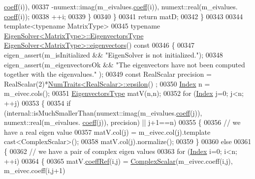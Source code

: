 \begin{DoxyCode}
      \hyperlink{class_eigen_1_1_plain_object_base_afbfc12954f16d21aedb7bd839f64a278}{coeff}(i)),
00337                                        -numext::imag(m\_eivalues.\hyperlink{class_eigen_1_1_plain_object_base_afbfc12954f16d21aedb7bd839f64a278}{coeff}(i)), numext::real(m\_eivalues.
      \hyperlink{class_eigen_1_1_plain_object_base_afbfc12954f16d21aedb7bd839f64a278}{coeff}(i));
00338       ++i;
00339     \}
00340   \}
00341   \textcolor{keywordflow}{return} matD;
00342 \}
00343 
00344 \textcolor{keyword}{template}<\textcolor{keyword}{typename} MatrixType>
00345 \textcolor{keyword}{typename} \hyperlink{group___core___module}{EigenSolver<MatrixType>::EigenvectorsType} 
      \hyperlink{group___eigenvalues___module_a66288022802172e3ee059283b26201d7}{EigenSolver<MatrixType>::eigenvectors}()\textcolor{keyword}{ const}
00346 \textcolor{keyword}{}\{
00347   eigen\_assert(m\_isInitialized && \textcolor{stringliteral}{"EigenSolver is not initialized."});
00348   eigen\_assert(m\_eigenvectorsOk && \textcolor{stringliteral}{"The eigenvectors have not been computed together with the eigenvalues."}
      );
00349   \textcolor{keyword}{const} RealScalar precision = RealScalar(2)*\hyperlink{group___core___module_struct_eigen_1_1_num_traits}{NumTraits<RealScalar>::epsilon}()
      ;
00350   \hyperlink{group___eigenvalues___module_a5bff6a6bc0efac67d52c60c2c3deb9ee}{Index} n = m\_eivec.cols();
00351   \hyperlink{group___core___module}{EigenvectorsType} matV(n,n);
00352   \textcolor{keywordflow}{for} (\hyperlink{group___eigenvalues___module_a5bff6a6bc0efac67d52c60c2c3deb9ee}{Index} j=0; j<n; ++j)
00353   \{
00354     \textcolor{keywordflow}{if} (internal::isMuchSmallerThan(numext::imag(m\_eivalues.\hyperlink{class_eigen_1_1_plain_object_base_afbfc12954f16d21aedb7bd839f64a278}{coeff}(j)), numext::real(m\_eivalues.
      \hyperlink{class_eigen_1_1_plain_object_base_afbfc12954f16d21aedb7bd839f64a278}{coeff}(j)), precision) || j+1==n)
00355     \{
00356       \textcolor{comment}{// we have a real eigen value}
00357       matV.col(j) = m\_eivec.col(j).template cast<ComplexScalar>();
00358       matV.col(j).normalize();
00359     \}
00360     \textcolor{keywordflow}{else}
00361     \{
00362       \textcolor{comment}{// we have a pair of complex eigen values}
00363       \textcolor{keywordflow}{for} (\hyperlink{group___eigenvalues___module_a5bff6a6bc0efac67d52c60c2c3deb9ee}{Index} i=0; i<n; ++i)
00364       \{
00365         matV.\hyperlink{class_eigen_1_1_plain_object_base_a25626a55b26a4323565f79d1b7c48ea8}{coeffRef}(i,j)   = \hyperlink{group___eigenvalues___module_a4d0b2a773357d0a6ec98e026f04002ed}{ComplexScalar}(m\_eivec.coeff(i,j),  m\_eivec.coeff(i,j+1)

\end{DoxyCode}
